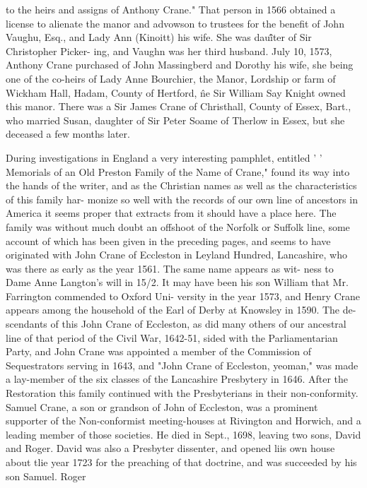 to the heirs and assigns of Anthony Crane." That person in 
1566 obtained a license to alienate the manor and advowson to 
trustees for the benefit of John Vaughu, Esq., and Lady Ann 
(Kinoitt) his wife. She was dau\^\^iter of Sir Christopher Picker- 
ing, and Vaughn was her third husband. July 10, 1573, Anthony 
Crane purchased of John Massingberd and Dorothy his wife, she 
being one of the co-heirs of Lady Anne Bourchier, the Manor, 
Lordship or farm of Wickham Hall, Hadam, County of Hertford, 
\^ne Sir William Say Knight owned this manor. There was a Sir 
James Crane of Christhall, County of Essex, Bart., who married 
Susan, daughter of Sir Peter Soame of Therlow in Essex, but she 
deceased a few months later. 

During investigations in England a very interesting pamphlet, 
entitled ' ' Memorials of an Old Preston Family of the Name of 
Crane," found its way into the hands of the writer, and as the 
Christian names as well as the characteristics of this family har- 
monize so well with the records of our own line of ancestors in 
America it seems proper that extracts from it should have a 
place here. The family was without much doubt an offshoot of 
the Norfolk or Suffolk line, some account of which has been given 
in the preceding pages, and seems to have originated with John 
Crane of Eccleston in Leyland Hundred, Lancashire, who was 
there as early as the year 1561. The same name appears as wit- 
ness to Dame Anne Langton's will in 15/2. It may have been 
his son William that Mr. Farrington commended to Oxford Uni- 
versity in the year 1573, and Henry Crane appears among the 
household of the Earl of Derby at Knowsley in 1590. The de- 
scendants of this John Crane of Eccleston, as did many others of 
our ancestral line of that period of the Civil War, 1642-51, sided 
with the Parliamentarian Party, and John Crane was appointed a 
member of the Commission of Sequestrators serving in 1643, and 
"John Crane of Eccleston, yeoman," was made a lay-member of 
the six classes of the Lancashire Presbytery in 1646. After the 
Restoration this family continued with the Presbyterians in their 
non-conformity. Samuel Crane, a son or grandson of John of 
Eccleston, was a prominent supporter of the Non-conformist 
meeting-houses at Rivington and Horwich, and a leading member 
of those societies. He died in Sept., 1698, leaving two sons, 
David and Roger. David was also a Presbyter dissenter, and 
opened liis own house about tlie year 1723 for the preaching of 
that doctrine, and was succeeded by his son Samuel. Roger 



